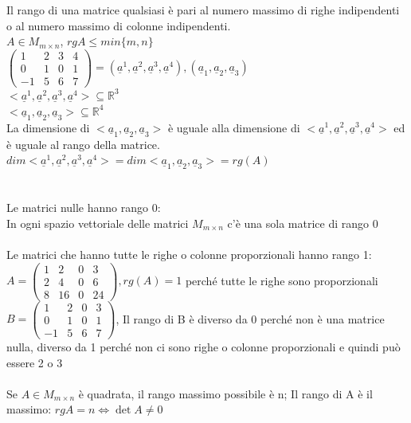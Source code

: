 Il rango di una matrice qualsiasi è pari al numero massimo di righe indipendenti o al numero massimo di colonne indipendenti.\\
$A\in M_{m\times n}$, $rgA\leqslant min\{m,n\}$\\
$\begin{pmatrix}
	1 & 2 & 3 & 4\\
	0 & 1 & 0 & 1\\
	-1 & 5 & 6 & 7
\end{pmatrix}=(\underline{a}^1, \underline{a}^2, \underline{a}^3, \underline{a}^4), (\underline{a}_1,\underline{a}_2,\underline{a}_3)$\\
$<\underline{a}^1, \underline{a}^2, \underline{a}^3, \underline{a}^4>\subseteq\mathbb{R}^3$\\
$<\underline{a}_1,\underline{a}_2,\underline{a}_3>\subseteq\mathbb{R}^4$\\
La dimensione di $<\underline{a}_1,\underline{a}_2,\underline{a}_3>$ è uguale alla dimensione di $<\underline{a}^1, \underline{a}^2, \underline{a}^3, \underline{a}^4>$ ed è uguale al rango della matrice.\\
$dim<\underline{a}^1, \underline{a}^2, \underline{a}^3, \underline{a}^4>=dim<\underline{a}_1,\underline{a}_2,\underline{a}_3>=rg(A)$\\\\\\
Le matrici nulle hanno rango 0:\\
In ogni spazio vettoriale delle matrici $M_{m\times n}$ c'è una sola matrice di rango 0\\\\
Le matrici che hanno tutte le righe o colonne proporzionali hanno rango 1:
$A=\begin{pmatrix}
	1 & 2 & 0 & 3\\
	2 & 4 & 0 & 6\\
	8 & 16 & 0 & 24
\end{pmatrix}, rg(A)=1$ perché tutte le righe sono proporzionali\\
$B=\begin{pmatrix}
	1 & 2 & 0 & 3\\
	0 & 1 & 0 & 1\\
	-1 & 5 & 6 & 7
\end{pmatrix}$, Il rango di B è diverso da 0 perché non è una matrice nulla, diverso da 1 perché non ci sono righe o colonne proporzionali e quindi può essere 2 o 3\\\\
Se $A\in M_{m\times n}$ è quadrata, il rango massimo possibile è n; Il rango di A è il massimo: $rgA=n\Leftrightarrow \det A\neq 0$


